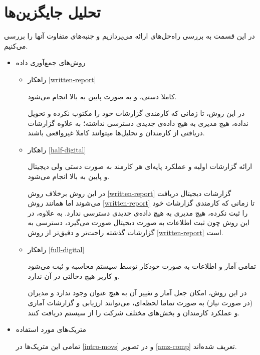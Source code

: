 \documentclass[12pt]{article}
\begin{document}
\section{تحلیل جایگزین‌ها}
در این قسمت به بررسی راه‌حل‌های ارائه می‌پردازیم و جنبه‌های متفاوت‌ آنها را بررسی می‌کنیم.

\begin{itemize}
\item         
روش‌های جمع‌آوری داده
\begin{itemize}
    \item راهکار \ref{written-report} 
    
    کاملا دستی، و به صورت پایین به بالا انجام می‌شود.
  
  در این روش، تا زمانی که کارمندی گزارشات خود را مکتوب نکرده و تحویل نداده، هیچ مدیری به هیچ داده‌ی جدیدی دسترسی نداشته؛ به علاوه گزارشات دریافتی از کارمندان و تحلیل‌ها میتوانند کاملا غیرواقعی‌ باشند.
    \item راهکار \ref{half-digital}
    
    ارائه گزارشات اولیه و عملکرد پایه‌ای هر کارمند به صورت دستی ولی دیجیتال و پایین به بالا انجام می‌شود.
    
    در این روش برخلاف روش \ref{written-report} گزارشات دیجیتال دریافت می‌شوند اما همانند روش \ref{written-report} تا زمانی که کارمندی گزارشات خود را ثبت نکرده، هیچ مدیری به هیچ داده‌ی جدیدی دسترسی ندارد. به علاوه، در این روش چون ثبت اطلاعات به صورت دیجیتال صورت می‌گیرد، دسترسی به گزارشات گذشته راحت‌تر و دقیق‌تر از روش \ref{written-report} است.
    
    \item راهکار \ref{full-digital}
    
    تمامی آمار و اطلاعات به صورت خودکار توسط سیستم محاسبه و ثبت می‌شود و کاربر هیچ دخالتی در آن ندارد.
    
    در این روش، امکان جعل آمار و تغییر آن به هیچ عنوان وجود ندارد و مدیران (در صورت نیاز) به صورت تماما لحظه‌ای، می‌توانند ارزیابی و گزارشات آماری و عملکرد کارمندان و بخش‌های مختلف شرکت را از سیستم دریافت کنند.
\end{itemize}
\item         
متریک‌های مورد استفاده

تمامی این متریک‌ها در \ref{intro-movs} و در تصویر \ref{amz-comp} تعریف شده‌اند.


\end{itemize}
\end{document}
